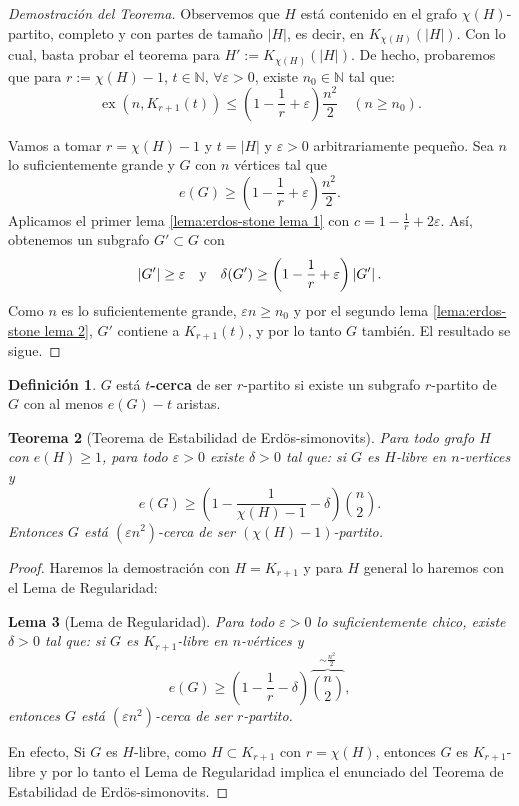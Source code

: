 \documentclass[12pt]{report}
\theoremstyle{plain}
\newtheorem{theorem}{Teorema}[section]
\newtheorem{lemma}[theorem]{Lema}
\theoremstyle{definition}
\newtheorem{definition}[theorem]{Definición}
\newcommand{\naturals}{\mathbb{N}}
\newcommand{\abs}[1]{\left \vert #1 \right \vert}
\newcommand{\ex}[2]{\operatorname{ex} (#1, #2)}
\begin{document}
\begin{proof}[Demostración del Teorema]
Observemos que $H$ está contenido en el grafo $\chi (H)$-partito, completo y con partes de tamaño $\abs H$, es decir, en $K_{\chi (H)} (\abs H)$. Con lo cual, basta probar el teorema para $H' := K_{\chi (H)} (\abs H)$. De hecho, probaremos que para $r := \chi (H)- 1$, $t \in \naturals$, $\forall \varepsilon > 0$, existe $n_0 \in \naturals$ tal que:
\[
    \ex n { K_{r +1} (t)} \leq \left (1 - \frac 1 r + \varepsilon \right ) \frac{n^2}{2} \quad (n \geq n_0).
\]

Vamos a tomar $r = \chi (H) - 1$ y $t = \abs H$ y $\varepsilon > 0$ arbitrariamente pequeño. Sea $n$ lo suficientemente grande y $G$ con $n$ vértices tal que
\[
    e(G) \geq \left ( 1 - \frac 1 r + \varepsilon \right ) \frac{n^2}{2}.
\]
Aplicamos el primer lema \ref{lema:erdos-stone lema 1} con $c = 1 - \frac 1 r + 2 \varepsilon$. Así, obtenemos un subgrafo $G' \subset G$ con
\[
    \abs{G'} \geq \varepsilon \quad \text y \quad \delta (G') \geq \left ( 1 - \frac 1 r + \varepsilon \right ) \abs{G'}.
\]
Como $n$ es lo suficientemente grande, $\varepsilon n \geq n_0$ y por el segundo lema \ref{lema:erdos-stone lema 2}, $G'$ contiene a $K_{r+1} (t)$, y por lo tanto $G$ también. El resultado se sigue.
\end{proof}


\begin{definition}
$G$ está \textbf{$t$-cerca} de ser $r$-partito si existe un subgrafo $r$-partito de $G$ con al menos $e(G) - t$ aristas.
\end{definition}





\begin{theorem}[Teorema de Estabilidad de Erdös-simonovits]
Para todo grafo $H$ con $e(H) \geq 1$, para todo $\varepsilon > 0$ existe $\delta > 0$ tal que: si $G$ es $H$-libre en $n$-vertices y
\[
    e(G) \geq \left ( 1 - \frac {1}{\chi (H) - 1} - \delta \right) \binom n 2.
\]
Entonces $G$ está $(\varepsilon n^2)$-cerca de ser $(\chi (H) - 1)$-partito.
\end{theorem}
\begin{proof}
Haremos la demostración con $H = K_{r+1}$ y para $H$ general lo haremos con el Lema de Regularidad:

\begin{lemma}[Lema de Regularidad]\label{lemma: Teorema de Estabilidad de Erdos-simonovits - lema de regularidad}
Para todo $\varepsilon > 0$ lo suficientemente chico, existe $\delta > 0$ tal que: si $G$ es $K_{r+1}$-libre en $n$-vértices y
\[
    e(G) \geq \left ( 1 - \frac 1 r - \delta\right) \overbrace{\binom n 2}^{\sim \frac {n^2}2},
\]
entonces $G$ está $(\varepsilon n^2)$-cerca de ser $r$-partito.
\end{lemma}

En efecto, Si $G$ es $H$-libre, como $H \subset K_{r+1}$ con $r = \chi (H)$, entonces $G$ es $K_{r+1}$-libre y por lo tanto el Lema de Regularidad implica el enunciado del Teorema de Estabilidad de Erdös-simonovits.
\end{proof}
\end{document}

